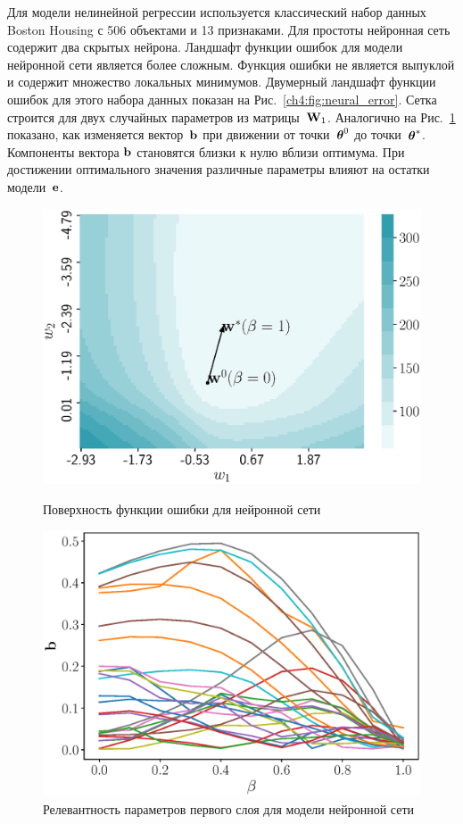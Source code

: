 Для модели нелинейной регрессии используется классический набор данных Boston Housing с 506 объектами и 13 признаками.
Для простоты нейронная сеть содержит два скрытых нейрона.
Ландшафт функции ошибок для модели нейронной сети является более сложным. 
Функция ошибки не является выпуклой и содержит множество локальных минимумов.
Двумерный ландшафт функции ошибок для этого набора данных показан на Рис.~\ref{ch4:fig:neural_error}. 
Сетка строится для двух случайных параметров из матрицы~$\mathbf{W}_1$.
Аналогично на Рис.~\ref{ch4:fig:neural_b_wrt_beta} показано, как изменяется вектор~$\mathbf{b}$ при движении от точки~$\boldsymbol{\theta}^0$ до точки~$\boldsymbol{\theta}^*$. 
Компоненты вектора $\mathbf{b}$ становятся близки к нулю вблизи оптимума. 
При достижении оптимального значения различные параметры влияют на остатки модели~$\mathbf{e}$.
\begin{figure}[h]
	\centering
	\begin{minipage}{.5\textwidth}
		\centering
		\includegraphics[width=\linewidth]{figs/ch4/neural_error}
		\caption{Поверхность функции ошибки для нейронной сети}
		\label{ch4:fig:neural_error}
	\end{minipage}%
	\begin{minipage}{.5\textwidth}
		\centering
		\includegraphics[width=\linewidth]{figs/ch4/neural_b_wrt_beta}
		\caption{Релевантность параметров первого слоя для модели нейронной сети}
		\label{ch4:fig:neural_b_wrt_beta}
	\end{minipage}
\end{figure}

